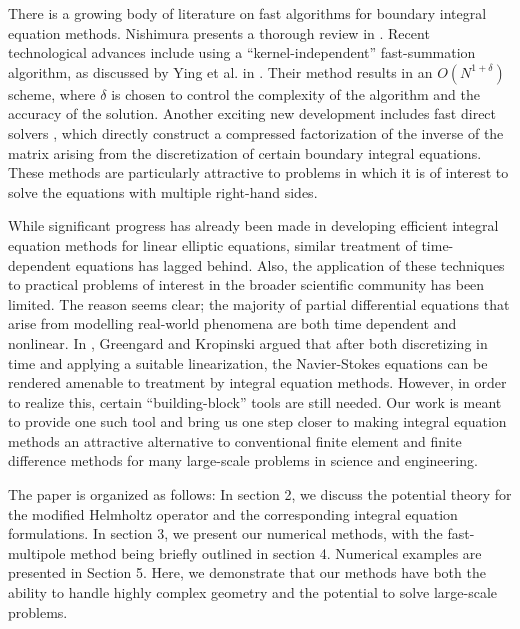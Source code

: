 \documentclass[preprint,12pt]{elsarticle}
\begin{document}
There is a growing body of literature on fast algorithms for boundary integral equation methods.
Nishimura presents a thorough review in \cite{nishimura}. 
Recent technological advances include using a ``kernel-independent'' fast-summation algorithm, as discussed by Ying et al. in \cite{ying_biros_zorin}.
Their method results in an $O(N^{1 + \delta})$ scheme, where $\delta$ is chosen to control the complexity of the algorithm and the accuracy of the solution. 
Another exciting new development includes fast direct solvers \cite{fast_direct,martinsson_rokhlin}, which directly construct a compressed factorization of the inverse of the matrix arising from the discretization of certain boundary integral equations. 
These methods are particularly attractive to problems in which it is of interest to solve the equations with multiple right-hand sides. 

While significant progress has already been made in developing efficient integral equation methods for linear elliptic equations, similar treatment of time-dependent equations has lagged behind. 
Also, the application of these techniques to practical problems of interest in the broader scientific community has been limited. 
The reason seems clear; the majority of partial differential equations that arise from modelling real-world phenomena are both time dependent and nonlinear. 
In \cite{int:equation:nse}, Greengard and Kropinski argued that after both discretizing in time and applying a suitable linearization, the Navier-Stokes equations can be rendered amenable to treatment by integral equation methods. 
However, in order to realize this, certain ``building-block'' tools are still needed.
Our work is meant to provide one such tool and bring us one step closer 
to making integral equation methods an attractive alternative to conventional finite element and finite difference methods for many large-scale problems in science and engineering.

The paper is organized as follows: In section 2, we discuss the potential theory for the modified Helmholtz operator and the corresponding integral equation formulations.
In section 3, we present our numerical methods, with the fast-multipole method being briefly outlined in section 4.
Numerical examples are presented in Section 5. Here, we demonstrate that our methods have both the ability to handle highly complex geometry and the potential to solve large-scale problems.
\end{document}
